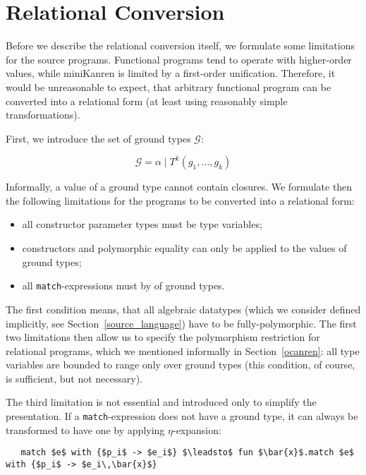 \section{Relational Conversion}
\label{conversion}
\def\arraystretch{1}

Before we describe the relational conversion itself, we formulate some limitations for the source
programs. Functional programs tend to operate with higher-order values, while miniKanren is
limited by a first-order unification. Therefore, it would be unreasonable to expect, that arbitrary
functional program can be converted into a relational form (at least using reasonably simple 
transformations). 

First, we introduce the set of ground types $\mathcal G$:

$$
\mathcal G=\alpha \mid T^k(g_1,\dots,g_k)
$$

Informally, a value of a ground type cannot contain closures. We formulate then the following limitations for
the programs to be converted into a relational form:

\begin{itemize}
  \item all constructor parameter types must be type variables;
  \item constructors and polymorphic equality can only be applied to the values of ground types;
  \item all \lstinline|match|-expressions must by of ground types.
\end{itemize}

The first condition means, that all algebraic datatypes (which we consider defined implicitly, see Section~\ref{source_language}) 
have to be fully-polymorphic. The first two limitations then allow us to specify the polymorphism restriction for 
relational programs, which we mentioned informally in Section~\ref{ocanren}: all type variables are bounded to
range only over ground types (this condition, of course, is sufficient, but not necessary).

The third limitation is not essential and introduced only to simplify the presentation. If a \lstinline|match|-expression does not
have a ground type, it can always be transformed to have one by applying $\eta$-expansion:

\begin{lstlisting}
   match $e$ with {$p_i$ -> $e_i$} $\leadsto$ fun $\bar{x}$.match $e$ with {$p_i$ -> $e_i\,\bar{x}$}
\end{lstlisting}

